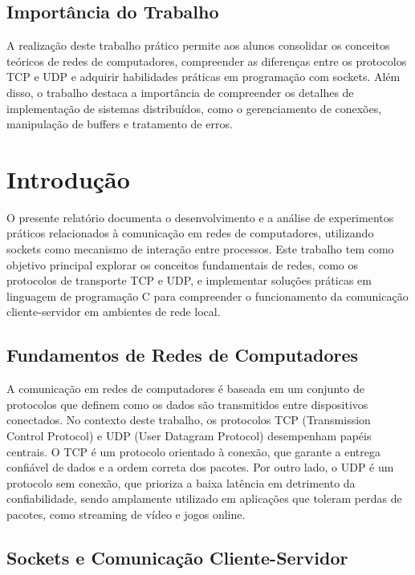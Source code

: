 \subsection*{Importância do Trabalho}

A realização deste trabalho prático permite aos alunos consolidar os conceitos teóricos de redes de computadores, compreender as diferenças entre os protocolos TCP e UDP e adquirir habilidades práticas em programação com sockets. Além disso, o trabalho destaca a importância de compreender os detalhes de implementação de sistemas distribuídos, como o gerenciamento de conexões, manipulação de buffers e tratamento de erros.

\section*{Introdução}

O presente relatório documenta o desenvolvimento e a análise de experimentos práticos relacionados à comunicação em redes de computadores, utilizando sockets como mecanismo de interação entre processos. Este trabalho tem como objetivo principal explorar os conceitos fundamentais de redes, como os protocolos de transporte TCP e UDP, e implementar soluções práticas em linguagem de programação C para compreender o funcionamento da comunicação cliente-servidor em ambientes de rede local.

\subsection*{Fundamentos de Redes de Computadores}

A comunicação em redes de computadores é baseada em um conjunto de protocolos que definem como os dados são transmitidos entre dispositivos conectados. No contexto deste trabalho, os protocolos TCP (Transmission Control Protocol) e UDP (User Datagram Protocol) desempenham papéis centrais. O TCP é um protocolo orientado à conexão, que garante a entrega confiável de dados e a ordem correta dos pacotes. Por outro lado, o UDP é um protocolo sem conexão, que prioriza a baixa latência em detrimento da confiabilidade, sendo amplamente utilizado em aplicações que toleram perdas de pacotes, como streaming de vídeo e jogos online.

\subsection*{Sockets e Comunicação Cliente-Servidor}

